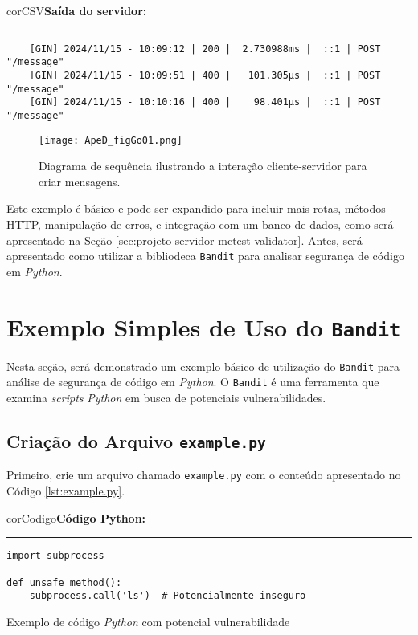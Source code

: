 \begin{myboxCode}{corCSV}{\textbf{Saída do servidor:}}\vspace{3mm}
    \hrule
    {\footnotesize
    \begin{verbatim}
    [GIN] 2024/11/15 - 10:09:12 | 200 |  2.730988ms |  ::1 | POST  "/message"
    [GIN] 2024/11/15 - 10:09:51 | 400 |   101.305µs |  ::1 | POST  "/message"
    [GIN] 2024/11/15 - 10:10:16 | 400 |    98.401µs |  ::1 | POST  "/message"
    \end{verbatim}
    }
    \end{myboxCode}
    

\begin{figure}[!ht]
    \centering
    \texttt{[image: ApeD\_figGo01.png]}
    \caption{Diagrama de sequência ilustrando a interação cliente-servidor para criar mensagens.}
    \label{fig:figGo01}
\end{figure}

Este exemplo é básico e pode ser expandido para incluir mais rotas, métodos HTTP, manipulação de erros, e integração com um banco de dados, como será apresentado na Seção \ref{sec:projeto-servidor-mctest-validator}. Antes, será apresentado como utilizar a bibliodeca \texttt{Bandit} para analisar segurança de código em \textit{Python}.

\section{Exemplo Simples de Uso do \texttt{Bandit}}\label{sec:exemplo-bandit}

Nesta seção, será demonstrado um exemplo básico de utilização do \texttt{Bandit} para análise de segurança de código em \textit{Python}. O \texttt{Bandit} é uma ferramenta que examina \textit{scripts} \textit{Python} em busca de potenciais vulnerabilidades.

\subsection{Criação do Arquivo \texttt{example.py}}

Primeiro, crie um arquivo chamado \texttt{example.py} com o conteúdo apresentado no Código \ref{lst:example.py}.

\begin{listing}[!ht]
    \begin{myboxCode}{corCodigo}{\textbf{Código Python: }}\vspace{3mm}
    \hrule
    \begin{verbatim}
import subprocess

def unsafe_method():
    subprocess.call('ls')  # Potencialmente inseguro
\end{verbatim}
\end{myboxCode}
\caption{Exemplo de código \textit{Python} com potencial vulnerabilidade}
\label{lst:example.py}
\end{listing}


